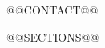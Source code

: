 \documentclass{resume}
\renewcommand{\printPersonalInfo}[1]{\begin{center}#1\end{center}\vspace{-0.35cm}}
\begin{document}
\printPersonalInfo{@@CONTACT@@}
\raggedright
@@SECTIONS@@
\end{document}
